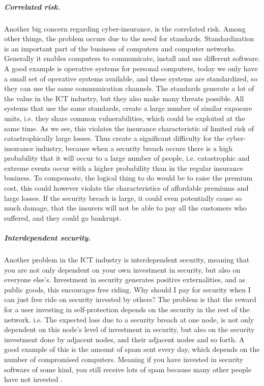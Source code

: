       
\subparagraph{Correlated risk.}

Another big concern regarding cyber-insurance, is the correlated risk. Among other things, the problem occurs due to the need for standards. Standardization is an important part of the business of computers and computer networks. Generally it enables computers to communicate, install and use different software. A good example is operative systems for personal computers, today we only have a small set of operative systems available, and these systems are standardized, so they can use the same communication channels. The standards generate a lot of the value in the ICT industry, but they also make many threats possible. All systems that use the same standards, create a large number of similar exposure units, i.e. they share common vulnerabilities, which could be exploited at the same time. As we see, this violates the insurance characteristic of limited risk of catastrophically large losses.  
Thus create a significant difficulty for the cyber-insurance industry, because when a security breach occurs there is a high probability that it will occur to a large number of people, i.e. catastrophic and extreme events occur with a higher probability than in the regular insurance business. To compensate, the logical thing to do would be to raise the premium cost, this could however violate the characteristics of affordable premiums and large losses. 
If the security breach is large, it could even potentially cause so much damage, that the insurers will not be able to pay all the customers who suffered, and they could go bankrupt.\cite{bohme2010modeling}


\subparagraph{Interdependent security.}
Another problem in the ICT industry is interdependent security, meaning that you are not only dependent on your own investment in security, but also on everyone else's. 
Investment in security generates positive externalities, and as public goods, this encourages free riding. Why should I pay for security when I can just free ride on security invested by others? The problem is that the reward for a user investing in self-protection depends on the security in the rest of the network. i.e. The expected loss due to a security breach at one node, is not only dependent on this node's level of investment in security, but also on the security investment done by adjacent nodes, and their adjacent nodes and so forth. A good example of this is the amount of spam sent every day, which depends on the number of compromised computers. Meaning if you have invested in security software of some kind, you still receive lots of spam because many other people have not invested \cite{towardsInsurable}.
 
